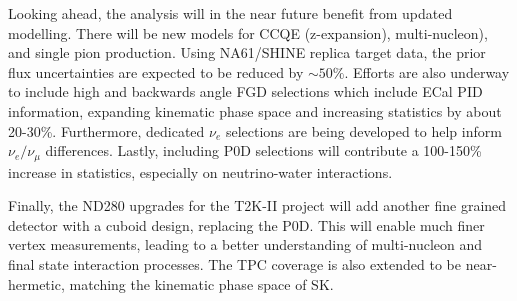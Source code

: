 Looking ahead, the analysis will in the near future benefit from updated modelling. There will be new models for CCQE (z-expansion\cite{z-exp}), multi-nucleon\cite{nieves1}), and single pion production\cite{thesis_minoo}. Using NA61/SHINE replica target data, the prior flux uncertainties are expected to be reduced by $\sim50\%$\cite{flux_red}. Efforts are also underway to include high and backwards angle FGD selections which include ECal PID information, expanding kinematic phase space and increasing statistics by about 20-30\%. Furthermore, dedicated $\nu_e$ selections are being developed to help inform $\nu_e/\nu_\mu$ differences. Lastly, including P0D selections will contribute a 100-150\% increase in statistics, especially on neutrino-water interactions.

Finally, the ND280 upgrades\cite{t2k_upgrades} for the T2K-II project\cite{t2k_ii} will add another fine grained detector with a cuboid design, replacing the P0D. This will enable much finer vertex measurements, leading to a better understanding of multi-nucleon and final state interaction processes. The TPC coverage is also extended to be near-hermetic, matching the kinematic phase space of SK.